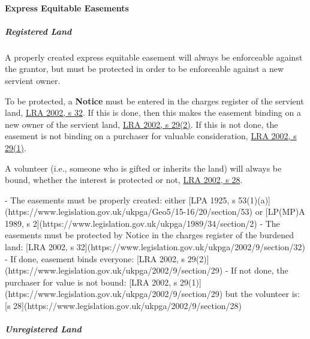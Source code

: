 \documentclass[
]{article}
\newenvironment{Shaded}{}{}
\newcommand{\NormalTok}[1]{#1}
\begin{document}
\hypertarget{express-equitable-easements}{%
\paragraph{Express Equitable
Easements}\label{express-equitable-easements}}

\hypertarget{registered-land-2}{%
\subparagraph{Registered Land}\label{registered-land-2}}

A properly created express equitable easement will always be enforceable
against the grantor, but must be protected in order to be enforceable
against a new servient owner.

To be protected, a \textbf{Notice} must be entered in the charges
register of the servient land,
\href{https://www.legislation.gov.uk/ukpga/2002/9/section/32}{LRA 2002,
s 32}. If this is done, then this makes the easement binding on a new
owner of the servient land,
\href{https://www.legislation.gov.uk/ukpga/2002/9/section/29}{LRA 2002,
s 29(2)}. If this is not done, the easement is not binding on a
purchaser for valuable consideration,
\href{https://www.legislation.gov.uk/ukpga/2002/9/section/29}{LRA 2002,
s 29(1)}.

A volunteer (i.e., someone who is gifted or inherits the land) will
always be bound, whether the interest is protected or not,
\href{https://www.legislation.gov.uk/ukpga/2002/9/section/28}{LRA 2002,
s 28}.

\begin{Shaded}
\begin{Highlighting}[]
\NormalTok{{-} The easements must be properly created: either [LPA 1925, s 53(1)(a)](https://www.legislation.gov.uk/ukpga/Geo5/15{-}16/20/section/53) or [LP(MP)A 1989, s 2](https://www.legislation.gov.uk/ukpga/1989/34/section/2)}
\NormalTok{{-} The easements must be protected by Notice in the charges register of the burdened land: [LRA 2002, s 32](https://www.legislation.gov.uk/ukpga/2002/9/section/32)}
\NormalTok{{-} If done, easement binds everyone: [LRA 2002, s 29(2)](https://www.legislation.gov.uk/ukpga/2002/9/section/29)}
\NormalTok{{-} If not done, the purchaser for value is not bound: [LRA 2002, s 29(1)](https://www.legislation.gov.uk/ukpga/2002/9/section/29) but the volunteer is: [s 28](https://www.legislation.gov.uk/ukpga/2002/9/section/28)}
\end{Highlighting}
\end{Shaded}

\hypertarget{unregistered-land-2}{%
\subparagraph{Unregistered Land}\label{unregistered-land-2}}
\end{document}

